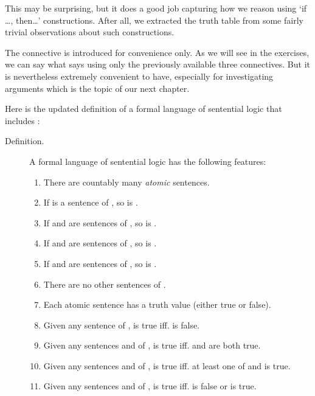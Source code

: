 This  may be surprising, but it does a good job capturing how we reason using 
`if \ldots, then\ldots' constructions. After all, we extracted the truth table 
from some fairly trivial observations about such constructions.

The connective \p{\limplies} is introduced for convenience only. As we will see 
in the exercises, we can say what  says using only the 
previously available three connectives. But it is nevertheless extremely 
convenient to have, especially for investigating arguments  which is the topic 
of our next chapter.

Here is the updated definition of a formal language of sentential logic that 
includes \p{\limplies}:


\begin{description}
\item[Definition.]  A formal language \lL{}{} of sentential logic has the 
 following features:
\begin{enumerate}

 \item There are countably many \emph{atomic} sentences.

 \item If  is a sentence of \lL{}, so is .

 \item If  and  are sentences of \lL{}, so is .

 \item If  and  are sentences of \lL{}, so is .

 \item If  and  are sentences of \lL{}, so is .

 \item There are no other sentences of \lL{}.

 \item Each atomic sentence has a truth value (either true or false).

 \item Given any sentence  of \lL{},   is true iff.  is 
  false.

 \item Given any sentences  and  of \lL{},  is 
  true iff.  and  are both true.

 \item Given any sentences  and  of \lL{},  is 
  true iff. at least one of  and  is true.

 \item Given any sentences  and  of \lL{}, 
  is true iff.  is false or  is true. 

\end{enumerate}
\end{description}



